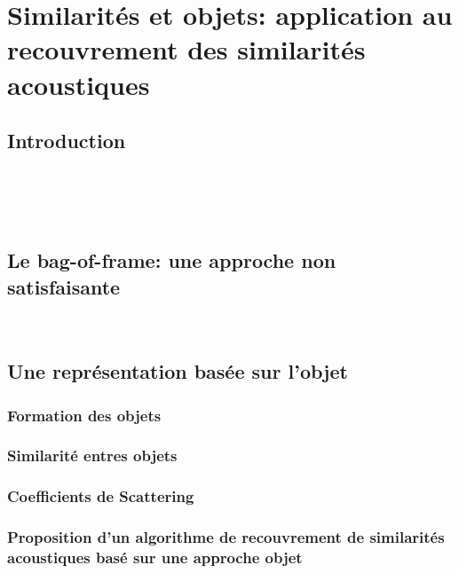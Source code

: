 \chapter[Similarités et objets]{Similarités et objets: application au recouvrement des similarités acoustiques}\label{ch:ml_xp}


\section{Introduction}
\label{sec:ch8_intro}

 \\ 

 \\ 

 \\

\section{Le bag-of-frame: une approche non satisfaisante}

 \\

\section{Une représentation basée sur l'objet}

\subsection{Formation des objets}

\subsection{Similarité entres objets}

\subsection{Coefficients de Scattering}


\subsection[Proposition d'un algorithme]{Proposition d'un algorithme de recouvrement de similarités acoustiques basé sur une approche objet}
\label{sec:ch8_algoObjet}

